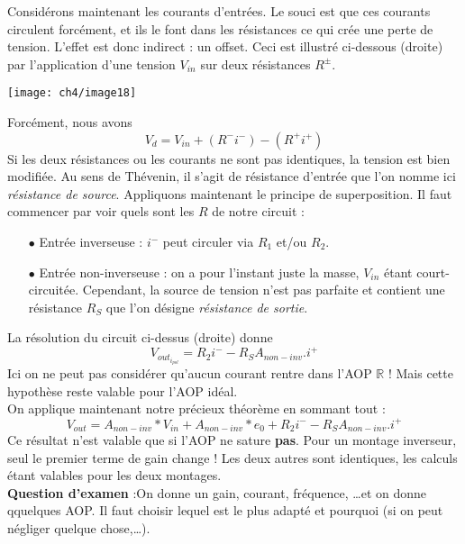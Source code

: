 		Considérons maintenant les courants d'entrées. Le souci est que ces courants 
		circulent forcément, et ils le font dans les résistances ce qui crée une 
		perte de tension. L'effet est donc indirect : un offset. Ceci est illustré 
		ci-dessous (droite) par l'application d'une tension $V_{in}$ sur deux 
		résistances $R^\pm$.
		\begin{center}
		\texttt{[image: ch4/image18]}
		\end{center}
		Forcément, nous avons
		\begin{equation}
		V_d = V_{in} + (R^-i^-)-(R^+i^+)
		\end{equation}				
		Si les deux résistances ou les courants ne sont pas identiques, la tension 
		est bien modifiée. Au sens de Thévenin, il s'agit de résistance d'entrée que 
		l'on nomme ici \textit{résistance de source}. Appliquons maintenant le 
		principe de superposition. Il faut commencer par voir quels sont les $R$ de 
		notre circuit :
		\begin{itemize}
		\item[$\bullet$] Entrée inverseuse : $i^-$ peut circuler via $R_1$ et/ou 
		$R_2$.
		\item[$\bullet$] Entrée non-inverseuse : on a pour l'instant juste la masse, 
		$V_{in}$ étant court-circuitée. Cependant, la source de tension n'est pas 
		parfaite et contient une résistance $R_S$ que l'on désigne \textit{résistance 
		de sortie}.
		\end{itemize}
		La résolution du circuit ci-dessus (droite) donne
		\begin{equation}
		V_{out_{i_{pol}}} = R_2i^- - R_SA_{non-inv}.i^+
		\end{equation}
		\danger Ici on ne peut pas considérer qu'aucun courant rentre dans l'AOP 
		$\mathbb{R}$ ! Mais cette hypothèse reste valable pour l'AOP idéal.\\
		
		On applique maintenant notre précieux théorème en sommant tout :
		\begin{equation}
		V_{out} = A_{non-inv}*V_{in} + A_{non-inv}*e_0 + R_2i^- - R_SA_{non-inv}.i^+
		\end{equation}
		Ce résultat n'est valable que si l'AOP ne sature \textbf{pas}. \danger Pour 
		un montage inverseur, seul le premier terme de gain change ! Les deux autres 
		sont identiques, les calculs étant valables pour les deux montages.\\
		
		\textbf{Question d'examen } :On donne un gain, courant, fréquence, \dots et on 
		donne qquelques AOP. Il faut choisir lequel est le plus adapté et pourquoi 
		(si on peut négliger quelque chose,\dots).
		

